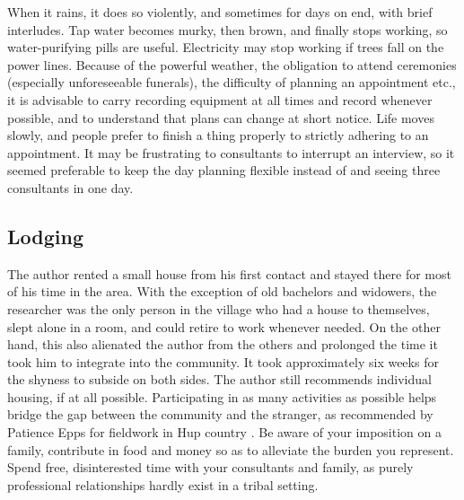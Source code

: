 When it rains, it does so violently, and sometimes for days on end, with brief interludes. Tap water becomes murky, then brown, and finally stops working, so water-purifying pills are useful. Electricity may stop working if trees fall on the power lines. %
Because of the powerful weather, the obligation to attend ceremonies (especially unforeseeable funerals), the difficulty of planning an appointment etc., it is advisable to carry recording equipment at all times and record whenever possible, and to understand that plans can change at short notice. Life moves slowly, and people prefer to finish a thing properly to strictly adhering to an appointment. It may be frustrating to consultants to interrupt an interview, so it seemed preferable to keep the day planning flexible instead of  and seeing three consultants in one day. 

\subsection{Lodging}
The author rented a small house from his first contact and stayed there for most of his time in the area. With the exception of old bachelors and widowers, the researcher was the only person in the village who had a house to themselves, slept alone in a room, and could retire to work whenever needed. On the other hand, this also alienated the author from the others and prolonged the time it took him to integrate into the community. It took approximately six weeks for the shyness to subside on both sides. The author still recommends individual housing, if at all possible. Participating in as many activities as possible helps bridge the gap between the community and the stranger, as recommended by Patience Epps for fieldwork in Hup country \parencite[37]{epps08hup}. %
Be aware of your imposition on a family, contribute in food and money so as to alleviate the burden you represent. Spend free, disinterested time with your consultants and family, as purely professional relationships hardly exist in a tribal setting. %

